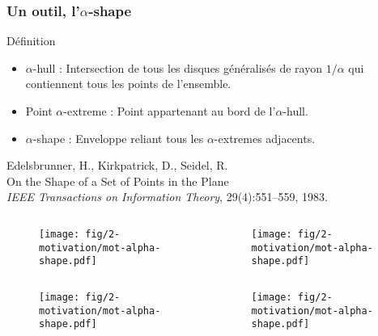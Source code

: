 \begin{frame}
  \frametitle{Un outil, l'$\alpha$-shape}
  \begin{block}{Définition}
    \begin{itemize}
      \item $\alpha$-hull : Intersection de tous les disques généralisés de rayon $1/\alpha$ qui contiennent tous les points de l'ensemble.
      \item Point $\alpha$-extreme : Point appartenant au bord de l'$\alpha$-hull.
      \item $\alpha$-shape : Enveloppe reliant tous les $\alpha$-extremes adjacents.
    \end{itemize}
\begin{tiny}
  [EKS83] Edelsbrunner, H., Kirkpatrick, D., Seidel, R.\\
  On the Shape of a Set of Points in the Plane\\
  {\em IEEE Transactions on Information Theory}, 29(4):551--559, 1983.\\
\end{tiny}   
  \end{block}
  \vspace{-1cm}
  { 
    \begin{columns}[t]
      \begin{column}{5cm}
        \begin{figure}[h!]
          \centering
          \texttt{[image: fig/2-motivation/mot-alpha-shape.pdf]}
         \end{figure}
       \end{column}
       \begin{column}{5cm}
         \begin{figure}[h!]
           \centering
           \texttt{[image: fig/2-motivation/mot-alpha-shape.pdf]}
         \end{figure}
       \end{column}
    \end{columns} 
  }
  { 
    \begin{columns}[t]
      \begin{column}{5cm}
        \begin{figure}[h!]
          \centering
          \texttt{[image: fig/2-motivation/mot-alpha-shape.pdf]}
         \end{figure}
       \end{column}
       \begin{column}{5cm}
         \begin{figure}[h!]
           \centering
           \texttt{[image: fig/2-motivation/mot-alpha-shape.pdf]}
         \end{figure}
       \end{column}
    \end{columns} 
  }
\end{frame}

